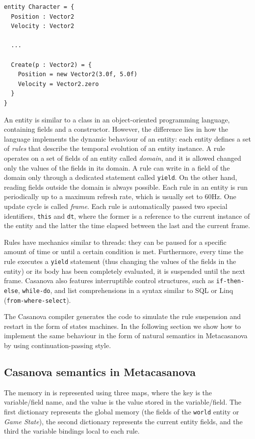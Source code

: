 \begin{lstlisting}
entity Character = {
  Position : Vector2
  Velocity : Vector2

  ...

  Create(p : Vector2) = {
    Position = new Vector2(3.0f, 5.0f)
    Velocity = Vector2.zero
  }  
}
\end{lstlisting} 

An entity is similar to a class in an object-oriented programming language, containing fields and a constructor. However, the difference lies in how the language implements the dynamic behaviour of an entity: each entity defines a set of \textit{rules} that describe the temporal evolution of an entity instance. A rule operates on a set of fields of an entity called \textit{domain}, and it is allowed changed only the values of the fields in its domain. A rule can write in a field of the domain only through a dedicated statement called \texttt{yield}. On the other hand, reading fields outside the domain is always possible. Each rule in an entity is run periodically up to a maximum refresh rate, which is usually set to 60Hz. One update cycle is called \textit{frame}. Each rule is automatically passed two special identifiers, \texttt{this} and \texttt{dt}, where the former is a reference to the current instance of the entity and the latter the time elapsed between the last and the current frame.

Rules have mechanics similar to threads: they can be paused for a specific amount of time or until a certain condition is met. Furthermore, every time the rule executes a \texttt{yield} statement (thus changing the values of the fields in the entity) or its body has been completely evaluated, it is suspended until the next frame. Casanova also features interruptible control structures, such as \texttt{if-then-else}, \texttt{while-do}, and list comprehensions in a syntax similar to SQL or Linq (\texttt{from-where-select}).
 
The Casanova compiler generates the code to simulate the rule suspension and restart in the form of states machines. In the following section we show how to implement the same behaviour in the form of natural semantics in Metacasanova by using continuation-passing style.

\subsection{Casanova semantics in Metacasanova}
\label{subsec:ch_mcnv_languages_casanova_semantics}
The memory in  is represented using three maps, where the key is the variable/field name, and the value is the value stored in the variable/field. The first dictionary represents the global memory (the fields of the \texttt{world} entity or \textit{Game State}), the second dictionary represents the current entity fields, and the third the variable bindings local to each rule.

